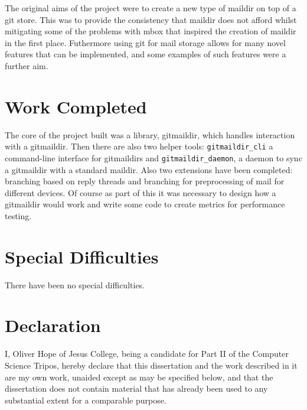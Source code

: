 \documentclass[12pt,a4paper,twoside,openright]{report}
\begin{document}
The original aims of the project were to create a new type of maildir on top of a git store. This was to provide the consistency that maildir does not afford whilst mitigating some of the problems with mbox that inspired the creation of maildir in the first place. Futhermore using git for mail storage allows for many novel features that can be implemented, and some examples of such features were a further aim.

\section*{Work Completed}

The core of the project built was a library, gitmaildir, which handles interaction with a gitmaildir. Then there are also two helper tools: \texttt{gitmaildir\_cli} a command-line interface for gitmaildirs and \texttt{gitmaildir\_daemon}, a daemon to sync a gitmaildir with a standard maildir. Also two extensions have been completed: branching based on reply threads and branching for preprocessing of mail for different devices. Of course as part of this it was necessary to design how a gitmaildir would work and write some code to create metrics for performance testing.

\section*{Special Difficulties}

There have been no special difficulties.

\newpage
\section*{Declaration}

I, Oliver Hope of Jesus College, being a candidate for Part II of the Computer
Science Tripos, hereby declare
that this dissertation and the work described in it are my own work,
unaided except as may be specified below, and that the dissertation
does not contain material that has already been used to any substantial
extent for a comparable purpose.

\bigskip
{}

\medskip
{}

\tableofcontents

\listoffigures

\newpage
\end{document}
